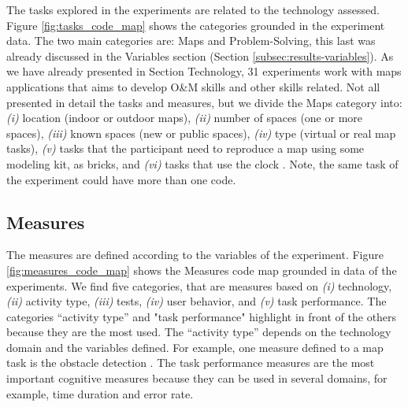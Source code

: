 The tasks explored in the experiments are related to the technology assessed. Figure \ref{fig:tasks_code_map} shows the categories grounded in the experiment data. The two main categories are: Maps and Problem-Solving, this last was already discussed in the Variables section (Section \ref{subsec:results-variables}). As we have already presented in Section Technology, 31 experiments work with maps applications that aims to develop O\&M skills and other skills related. Not all presented in detail the tasks and measures, but we divide the Maps category into: \textit{(i)} location (indoor or outdoor maps), \textit{(ii)} number of spaces (one or more spaces), \textit{(iii)} known spaces (new or public spaces), \textit{(iv)} type (virtual or real map tasks), \textit{(v)} tasks that the participant need to reproduce a map using some modeling kit, as bricks, and \textit{(vi)} tasks that use the clock \cite{SanchezVideogaming}. Note, the same task of the experiment could have more than one code. 
\begin{landscape}
    \begin{figure}[h] 

   	    \captionsetup{width=25cm}%
	\end{figure}
\end{landscape}
	
\subsection{Measures}
\label{subsec:results-measures}

The measures are defined according to the variables of the experiment. Figure \ref{fig:measures_code_map} shows the Measures code map grounded in data of the experiments. We find five categories, that are measures based on \textit{(i)} technology, \textit{(ii)} activity type, \textit{(iii)} tests, \textit{(iv)} user behavior, and \textit{(v)} task performance. The categories ``activity type'' and "task performance" highlight in front of the others because they are the most used. The ``activity type'' depends on the technology domain and the variables defined. For example, one measure defined to a map task is the obstacle detection \cite{Merabet2016}. The task performance measures are the most important cognitive measures because they can be used in several domains, for example, time duration and error rate.

